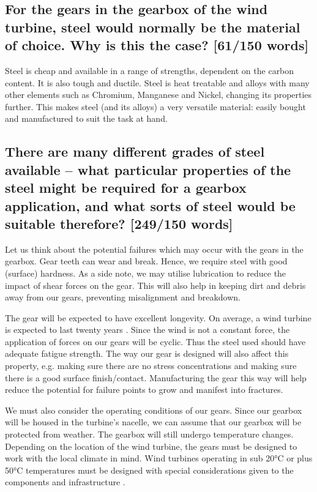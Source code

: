 \documentclass[12pt]{article}
\numberwithin{equation}{section}
\begin{document}
\begin{flushleft}
\subsection[Why is steel used?]{For the gears in the gearbox of the wind turbine, steel would normally be the material of choice. Why is this the case? [61/150 words]}
Steel is cheap and available in a range of strengths, dependent on the carbon content. It is also tough and ductile. Steel is heat treatable and alloys with many other elements such as Chromium, Manganese and Nickel, changing its properties further. This makes steel (and its alloys) a very versatile material: easily bought and manufactured to suit the task at hand.
\subsection[What steel is suitable?]{There are many different grades of steel available – what particular properties of the steel might be required for a gearbox application, and what sorts of steel would be suitable therefore? [249/150 words]}
Let us think about the potential failures which may occur with the gears in the gearbox. Gear teeth can wear and break. Hence, we require steel with good (surface) hardness. As a side note, we may utilise lubrication to reduce the impact of shear forces on the gear. This will also help in keeping dirt and debris away from our gears, preventing misalignment and breakdown. 

The gear will be expected to have excellent longevity. On average, a wind turbine is expected to last twenty years \citep{windTurbineLifetime}. Since the wind is not a constant force, the application of forces on our gears will be cyclic. Thus the steel used should have adequate fatigue strength. The way our gear is designed will also affect this property, e.g. making sure there are no stress concentrations and making sure there is a good surface finish/contact. Manufacturing the gear this way will help reduce the potential for failure points to grow and manifest into fractures. 

We must also consider the operating conditions of our gears. Since our gearbox will be housed in the turbine's nacelle, we can assume that our gearbox will be protected from weather. The gearbox will still undergo temperature changes. Depending on the location of the wind turbine, the gears must be designed to work with the local climate in mind. Wind turbines operating in sub 20\si{\celsius} or plus 50\si{\celsius} temperatures must be designed with special considerations given to the components and infrastructure \citep{windTurbineOperatingConditions}. 


\end{flushleft}
\end{document}
